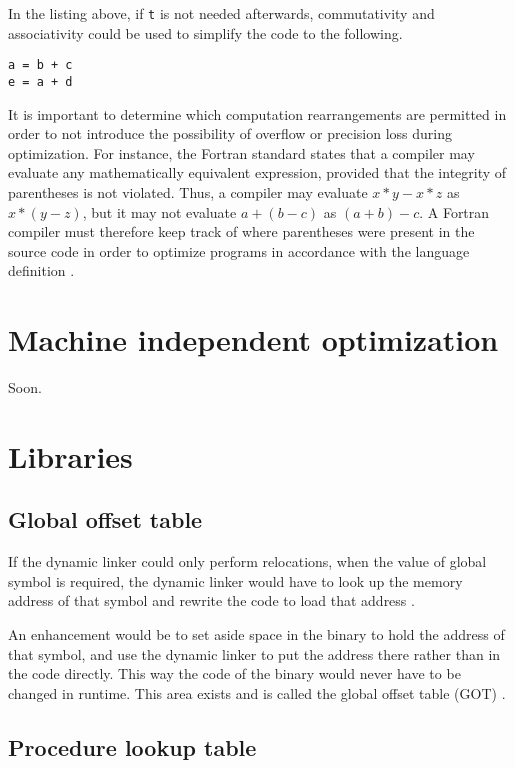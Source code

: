 In the listing above, if \texttt{t} is not needed afterwards, commutativity and associativity could be used to simplify the code to the following.

\begin{lstlisting}
a = b + c
e = a + d
\end{lstlisting}

It is important to determine which computation rearrangements are permitted in order to not introduce the possibility of overflow or precision loss during optimization.
For instance, the Fortran standard states that a compiler may evaluate any mathematically equivalent expression, provided that the integrity of parentheses is not violated.
Thus, a compiler may evaluate \(x * y - x * z\) as \(x * (y - z)\), but it may not evaluate \(a + (b - c)\) as \((a + b) - c\).
A Fortran compiler must therefore keep track of where parentheses were present in the source code in order to optimize programs in accordance with the language definition \cite[p.~537]{compilers-aho-2007}.

\section{Machine independent optimization}

Soon.

\section{Libraries}

\subsection{Global offset table}

If the dynamic linker could only perform relocations, when the value of global symbol is required, the dynamic linker would have to look up the memory address of that symbol and rewrite the code to load that address \cite{computer-science-from-the-bottom-up}.

An enhancement would be to set aside space in the binary to hold the address of that symbol, and use the dynamic linker to put the address there rather than in the code directly.
This way the code of the binary would never have to be changed in runtime.
This area exists and is called the global offset table (GOT) \cite{computer-science-from-the-bottom-up}.

\subsection{Procedure lookup table}

